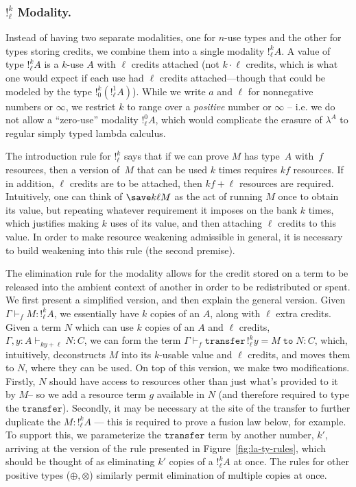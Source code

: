 \subsubsection{$!^k_\ell$ Modality.}
Instead of having two separate modalities, one for $n$-use types and the
other for types storing credits, we combine them into a single modality
$!^k_\ell A$. A value of type $!^k_\ell A$ is a $k$-use $A$ with $\ell$
credits attached (not $k \cdot \ell$ credits, which is what one would
expect if each use had $\ell$ credits attached---though that could be
modeled by the type $!^k_0 (!^1_\ell A)$).  While we write $a$ and
$\ell$ for nonnegative numbers or $\infty$, we restrict $k$ to range
over a \emph{positive} number or $\infty$ -- i.e. we do not allow a
``zero-use'' modality $!^0_\ell A$, which would complicate the
erasure of $\lambda^A$ to regular simply typed lambda calculus.

The introduction rule for $!^k_\ell$ says that if we can prove $M$ has
type~$A$ with~$f$ resources, then a version of~$M$ that can be used $k$
times requires $kf$ resources.  If in addition, $\ell$ credits are to be
attached, then $kf+\ell$ resources are required.  Intuitively, one can
think of $\save k \ell M$ as the act of running $M$ once to obtain its
value, but repeating whatever requirement it imposes on the bank $k$
times, which justifies making $k$ uses of its value, and then attaching
$\ell$ credits to this value.  In order to make resource weakening
admissible in general, it is necessary to build weakening into this
rule (the second premise).

The elimination rule for the modality allows for the credit stored
on a term to be released into the ambient context of another in order to
be redistributed or spent. We first present a simplified version, and
then explain the general version. Given $\Gamma \vdash_f M : !^k_\ell
A$, we essentially have $k$ copies of an $A$, along with $\ell$ extra
credits. Given a term $N$ which can use $k$ copies of an $A$ and $\ell$
credits, $\Gamma,y : A \vdash_{ky + \ell} N : C$, we can form the term
$\Gamma \vdash_{f} \texttt{transfer} \, !^k_\ell y = M \; \texttt{to} \;
N : C$, which, intuitively, deconstructs $M$ into its $k$-usable value
and $\ell$ credits, and moves them to $N$, where they can be used. On
top of this version, we make two modifications. Firstly, $N$ should have
access to resources other than just what's provided to it by $M$-- so we
add a resource term $g$ available in $N$ (and
therefore required to type the
$\texttt{transfer}$). Secondly, it may be necessary at the site of the
transfer to further duplicate the $M : !^k_\ell A$ --- this is required to
prove a fusion law below, for example.  To support this,
we parameterize the $\texttt{transfer}$ term
by another number, $k'$, arriving at the version of the rule
presented in Figure~\ref{fig:la-ty-rules}, which should be thought of as
eliminating $k'$ copies of a $!^k_\ell A$ at once.
The rules for other positive types ($\oplus,\otimes$) similarly permit elimination of multiple copies at
once.

